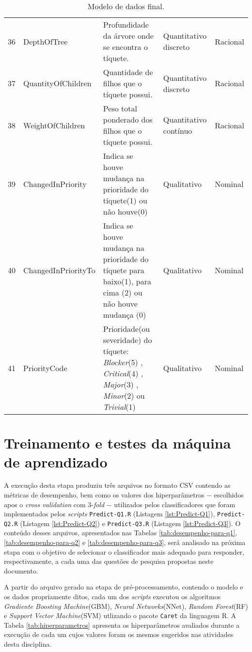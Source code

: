 \documentclass[11pt,twoside]{article}
\begin{document}
\begin{table}[ht]
\begin{tabular}{@{}llp{9cm}p{2cm}l@{}}
	36 & DepthOfTree & Profundidade da árvore onde se encontra o tíquete. & Quantitativo discreto & Racional\\
	37 & QuantityOfChildren & Quantidade de filhos que o tíquete possui. & Quantitativo discreto & Racional\\
	38 & WeightOfChildren & Peso total ponderado dos filhos que o tíquete possui. & Quantitativo contínuo & Racional\\
	39 & ChangedInPriority & Indica se houve mudança na prioridade do tíquete(1) ou não houve(0)& Qualitativo & Nominal\\    
	40 & ChangedInPriorityTo & Indica se houve mudança na prioridade do tíquete para baixo(1), para cima (2) ou não houve mudança (0)& Qualitativo & Nominal\\
	41  &  PriorityCode  &  Prioridade(ou severidade) do tíquete: \textit{Blocker}(5) ,  \textit{Critical}(4) ,  \textit{Major}(3) ,  \textit{Minor}(2) ou \textit{Trivial}(1)  &  Qualitativo  &  Nominal \\
 
    \bottomrule 
  \end{tabular}
  \caption{Modelo de dados final.}
  \label{tab:modelo-final}
\end{table}


\section{Treinamento e testes da máquina de aprendizado}
A execução desta etapa produziu três arquivos no formato CSV contendo as métricas de desempenho, bem como os valores dos hiperparâmetros $-$ escolhidos apos o \textit{cross validation} 
com 3-\textit{fold} $-$ utilizados pelos classificadores que foram implementados pelos \textit{scripts} \texttt{Predict-Q1.R} (Listagem \ref{lst:Predict-Q1}), \texttt{Predict-Q2.R} (Listagem \ref{lst:Predict-Q2}) e \texttt{Predict-Q3.R} (Listagem \ref{lst:Predict-Q3}). O conteúdo 
desses arquivos, apresentados nas Tabelas \ref{tab:desempenho-para-q1}, \ref{tab:desempenho-para-q2} e \ref{tab:desempenho-para-q3}, será analisado na próxima etapa com o objetivo de 
selecionar o classificador mais adequado para responder, respectivamente, a cada  uma das questões de 
pesquisa propostas neste documento. 

A partir do arquivo gerado na etapa de pré-processamento, contendo o modelo e os dados propriamente ditos, cada um dos \textit{scripts} executou os algoritmos \textit{Gradiente Boosting Machine}(GBM), 
\textit{Neural Networks}(NNet), \textit{Random Forest}(RF) e \textit{Support Vector Machine}(SVM) utlizando o pacote \texttt{Caret}\cite{CAR} da linguagem R. A Tabela \ref{tab:hiperparametros} apresenta 
os hiperparâmetros avaliados durante a execução de cada um cujos valores foram os mesmos sugeridos nas atividades desta disciplina.
\end{document}
